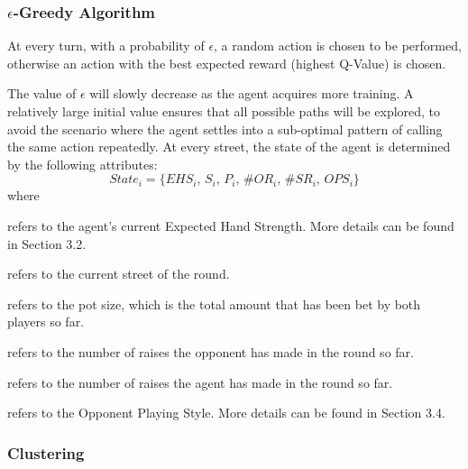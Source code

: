 \documentclass{article}
\begin{document}
\subsubsection{$\epsilon$-Greedy Algorithm}

At every turn, with a probability of $\epsilon$, a random action is chosen to be performed, otherwise an action with the best expected reward (highest Q-Value) is chosen.

The value of $\epsilon$ will slowly decrease as the agent acquires more training. A relatively large initial value ensures that all possible paths will be explored, to avoid the scenario where the agent settles into a sub-optimal pattern of calling the same action repeatedly. At every street, the state of the agent is determined by the following attributes:
\begin{displaymath}
State_i = \{ EHS_i \text{, } S_i \text{, }P_i\text{, }\#OR_i\text{, }\#SR_i\text{, }OPS_i\}
\end{displaymath}
where

\begin{description}[style=multiline,leftmargin=10mm]
\item [\emph{EHS}]refers to the agent's current Expected Hand Strength. More details can be found in Section 3.2.
\item [\emph{S}]refers to the current street of the round.
\item [\emph{P}]refers to the pot size, which is the total amount that has been bet by both players so far.
\item [\emph{\#OR}]refers to the number of raises the opponent has made in the round so far.
\item [\emph{\#SR}]refers to the number of raises the agent has made in the round so far.
\item [\emph{OPS}]refers to the Opponent Playing Style. More details can be found in Section 3.4.
\end{description}

\subsubsection{Clustering}
\end{document}
